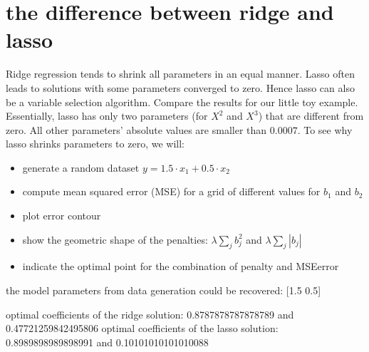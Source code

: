 \documentclass[letterpaper,10pt,english]{jupyterBook}
\begin{document}
\section{the difference between ridge and lasso}
\label{\detokenize{Regression_Techniques:the-difference-between-ridge-and-lasso}}
\sphinxAtStartPar
Ridge regression tends to shrink all parameters in an equal manner. Lasso often leads to solutions with some parameters converged to zero. Hence lasso can also be a variable selection algorithm. Compare the results for our little toy example. Essentially, lasso has only two parameters (for \(X^2\) and \(X^3\)) that are different from zero. All other parameters’ absolute values are smaller than \(0.0007\).
To see why lasso shrinks parameters to zero, we will:
\begin{itemize}
\item {} 
\sphinxAtStartPar
generate a random dataset \(y = 1.5 \cdot x_1 + 0.5 \cdot x_2\)

\item {} 
\sphinxAtStartPar
compute mean squared error (MSE) for a grid of different values for \(b_1\) and \(b_2\)

\item {} 
\sphinxAtStartPar
plot error contour

\item {} 
\sphinxAtStartPar
show the geometric shape of the penalties: \(\lambda \sum_j b_j^2\) and \(\lambda \sum_j |b_j|\)

\item {} 
\sphinxAtStartPar
indicate the optimal point for the combination of penalty and MSE\sphinxhyphen{}error

\end{itemize}

\begin{sphinxVerbatim}[commandchars=\\\{\}]
the model parameters from data generation could be recovered: [1.5 0.5]
\end{sphinxVerbatim}

\noindent{}

\begin{sphinxVerbatim}[commandchars=\\\{\}]
optimal coefficients of the ridge solution: 0.8787878787878789 and 0.47721259842495806
optimal coefficients of the lasso solution: 0.8989898989898991 and 0.10101010101010088
\end{sphinxVerbatim}
\end{document}
